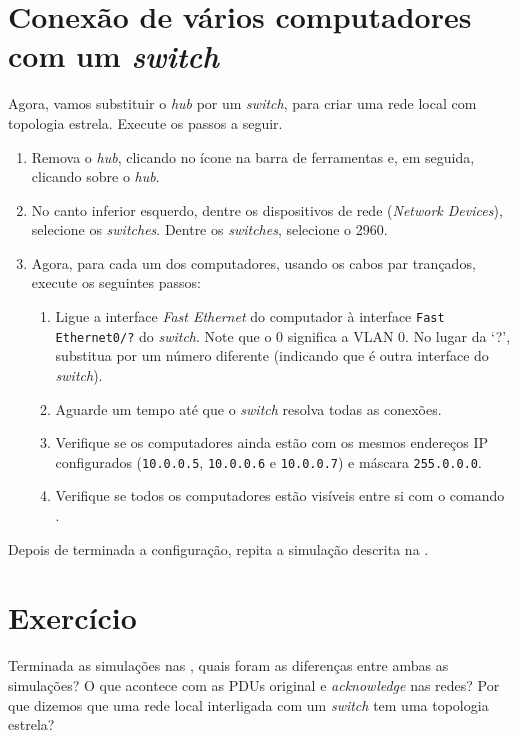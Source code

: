 \section{Conexão de vários computadores com um \textit{switch}}\label{sec:conexSwitch}
Agora, vamos substituir o \textit{hub} por um \textit{switch}, para criar uma rede local com topologia estrela. Execute os passos a seguir.

\begin{enumerate}[label*=\arabic*.]
        \item Remova o \textit{hub}, clicando no ícone  na barra de ferramentas e, em seguida, clicando sobre o \textit{hub}.
        \item No canto inferior esquerdo, dentre os dispositivos de rede (\textit{Network Devices}), selecione os \textit{switches}. Dentre os \textit{switches}, selecione o 2960.
        \item Agora, para cada um dos computadores, usando os cabos par trançados, execute os seguintes passos:
          \begin{enumerate}[label*=\arabic*.]
            \item Ligue a interface \textit{Fast Ethernet} do computador à interface \texttt{Fast Ethernet0/?} do \textit{switch}. Note que o 0 significa a VLAN 0. No lugar da `?', substitua por um número diferente (indicando que é outra interface do \textit{switch}).

            \item Aguarde um tempo até que o \textit{switch} resolva todas as conexões.

            \item Verifique se os computadores ainda estão com os mesmos endereços IP configurados (\texttt{10.0.0.5}, \texttt{10.0.0.6} e \texttt{10.0.0.7}) e máscara \texttt{255.0.0.0}.

            \item Verifique se todos os computadores estão visíveis entre si com o comando .
          \end{enumerate}
\end{enumerate}

Depois de terminada a configuração, repita a simulação descrita na .

\section{Exercício}
Terminada as simulações nas , quais foram as diferenças entre ambas as simulações?  O que acontece com as PDUs original e \textit{acknowledge} nas redes?  Por que dizemos que uma rede local interligada com um \textit{switch} tem uma topologia estrela?